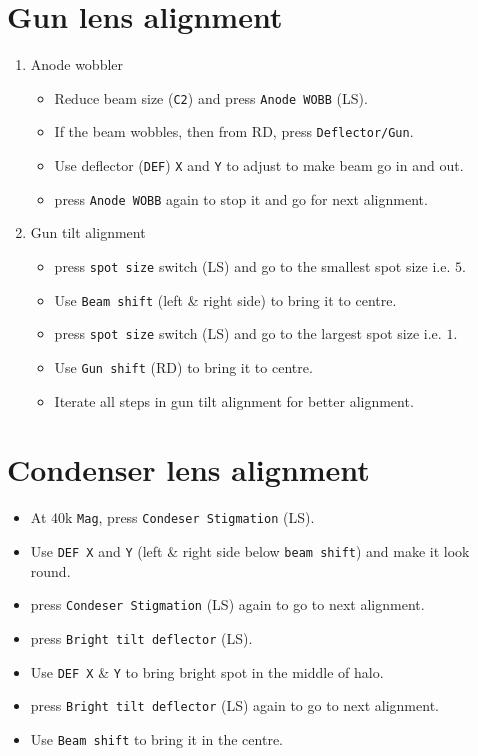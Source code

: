 \documentclass[letterpaper,12pt]{article}
\begin{document}
\section{Gun lens alignment}
\begin{enumerate}
\item Anode wobbler
	\begin{itemize}
	\item Reduce beam size (\texttt{C2}) and press \texttt{Anode WOBB} (LS\footnotemark[1]).
	\item If the beam wobbles, then from RD\footnotemark[1], press \texttt{Deflector/Gun}.
	\item Use deflector (\texttt{DEF}) \texttt{X} and \texttt{Y} to adjust to make beam go in and out.
	\item press \texttt{Anode WOBB} again to stop it and go for next alignment.
	\end{itemize}
\item Gun tilt alignment
	\begin{itemize}
	\item press \texttt{spot size} switch (LS\footnotemark[1]) and go to the smallest spot size i.e. $5$.
	\item Use \texttt{Beam shift} (left \& right side) to bring it to centre.
	\item press \texttt{spot size} switch (LS\footnotemark[1]) and go to the largest spot size i.e. $1$.
	\item Use \texttt{Gun shift} (RD\footnotemark[1]) to bring it to centre.
	\item Iterate all steps in gun tilt alignment for better alignment.
	\end{itemize}
\end{enumerate}

\section{Condenser lens alignment}
\begin{itemize}
\item At $40$k \texttt{Mag}, press \texttt{Condeser Stigmation} (LS\footnotemark[1]).
\item Use \texttt{DEF X} and \texttt{Y} (left \& right side below \texttt{beam shift}) and make it look round.
\item press \texttt{Condeser Stigmation} (LS\footnotemark[1]) again to go to next alignment.
\item press \texttt{Bright tilt deflector} (LS\footnotemark[1]).
\item Use \texttt{DEF X} \& \texttt{Y} to bring bright spot in the middle of halo.
\item press \texttt{Bright tilt deflector} (LS\footnotemark[1]) again to go to next alignment.
\item Use \texttt{Beam shift} to bring it in the centre.
\end{itemize}
\end{document}
